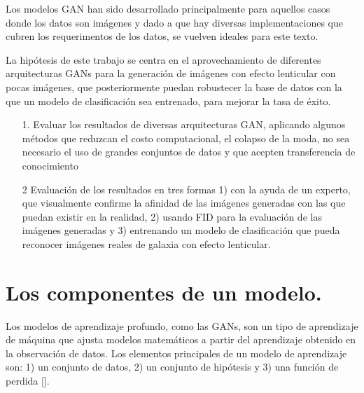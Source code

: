 \documentclass[letterpaper,12pt,oneside]{book}
\begin{document}
            Los modelos GAN han sido desarrollado principalmente para aquellos casos donde los datos son imágenes y dado a que hay diversas implementaciones que cubren los requerimentos de los datos, se vuelven ideales para este texto.




            La hipótesis de este trabajo se centra en el aprovechamiento de diferentes arquitecturas GANs para la generación de imágenes con efecto lenticular con pocas imágenes, que posteriormente puedan robustecer la base de datos con la que un modelo de clasificación sea entrenado, para mejorar la tasa de éxito. 

            \begin{itemize}
                \item[1.]Evaluar los resultados de diversas arquitecturas GAN, aplicando algunos métodos que reduzcan el costo computacional, el colapso de la moda, no sea necesario el uso de grandes conjuntos de datos y que acepten transferencia de conocimiento
                \item[2] Evaluación de los resultados en tres formas 1) con la ayuda de un experto, que visualmente confirme la afinidad de las imágenes generadas con las que puedan existir en la realidad, 2) usando FID para la evaluación de las imágenes generadas y 3) entrenando un modelo de clasificación que pueda reconocer imágenes reales de galaxia con efecto lenticular.  
            \end{itemize}
            
            


            
            
        \chapter{Los componentes de un modelo.}
            Los modelos de aprendizaje profundo, como las GANs, son un tipo de aprendizaje de máquina que ajusta modelos matemáticos a partir del aprendizaje obtenido en la observación de datos. Los elementos principales de un modelo de aprendizaje son: 1) un conjunto de datos, 2) un conjunto de hipótesis y 3) una función de perdida [\cite{prince2023understanding}]. 
\end{document}
